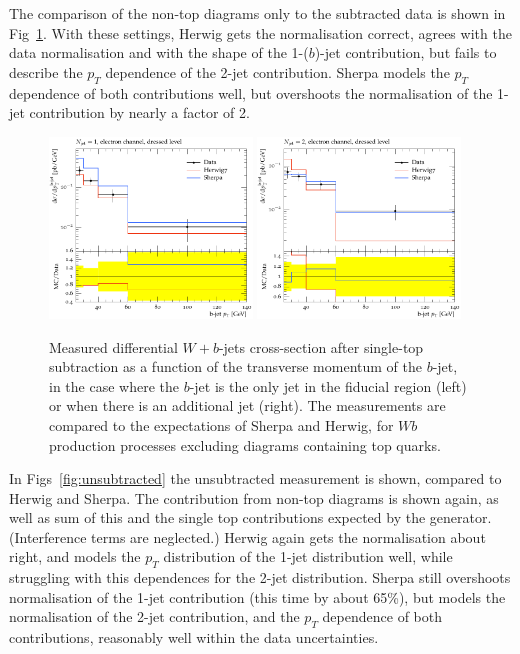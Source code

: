 \documentclass[11pt]{cernrep}
\begin{document}
The comparison of the non-top diagrams only to the subtracted data is shown in Fig~\ref{fig:subtracted}. 
With these settings, Herwig gets the normalisation correct, agrees with the data normalisation and with
the shape of the 1-($b$)-jet contribution, but fails to describe the $p_T$ dependence of the 2-jet contribution.
Sherpa models the $p_T$ dependence of both contributions well, but overshoots the normalisation of the 1-jet
contribution by nearly a factor of 2.

\begin{figure}
\centering
	\includegraphics[width=0.48\textwidth]{subtracted_h7_s22-1jet.pdf}
	\includegraphics[width=0.48\textwidth]{subtracted_h7_s22-2jet.pdf}
\caption{\label{fig:subtracted}
  Measured differential $W+b$-jets cross-section after single-top subtraction as a function of the
  transverse momentum of the $b$-jet, in the case where the $b$-jet is the only jet in the fiducial region
  (left) or when there is an additional jet (right). The measurements are compared to the expectations of
  Sherpa and Herwig, for $Wb$ production processes excluding diagrams containing top quarks.}
\end{figure}

In Figs~\ref{fig:unsubtracted} the unsubtracted measurement is shown, compared to Herwig and Sherpa.
The contribution from non-top diagrams is shown again, as well as sum of this and the single top
contributions expected by the generator. (Interference terms are neglected.) Herwig again gets the
normalisation about right, and models the $p_T$ distribution of the 1-jet distribution well, while
struggling with this dependences for the 2-jet distribution. Sherpa still overshoots normalisation of
the 1-jet contribution (this time by about 65\%), but models the normalisation of the 2-jet contribution,
and the $p_T$ dependence of both contributions, reasonably well within the data uncertainties.
\end{document}
